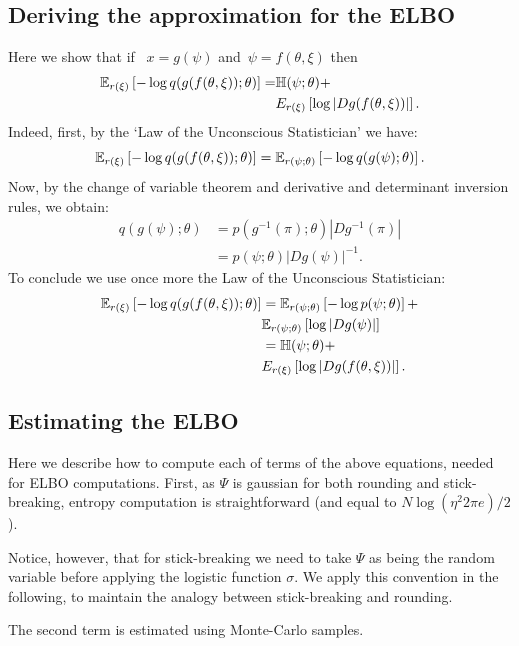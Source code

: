 \documentclass[twoside]{article}
\begin{document}
\subsection*{Deriving the approximation for the ELBO}
Here we show that if ~${x = g(\psi)}$ and~${\psi = f(\theta,
  \xi)}$ then \begin{align} \nonumber
\mathbb{E}_{r(\xi)} \left[- \log q(g(f(\theta, \xi)); \theta) \right] = & \mathbb{H}(\psi; \theta) +\\ \nonumber & E_{r(\xi)}\left[\log | Dg(f(\theta, \xi))|\right].\end{align}
Indeed, first, by the `Law of the Unconscious Statistician' we have:
 $$\mathbb{E}_{r(\xi)} \left[- \log q(g(f(\theta, \xi)); \theta) \right] = \mathbb{E}_{r(\psi;\theta)} \left[- \log q(g(\psi); \theta) \right]. $$
Now, by the change of variable theorem and derivative and determinant inversion rules, we obtain:\begin{align}
\nonumber q(g(\psi); \theta) & = p(g^{-1}(\pi) ;\theta)  |Dg ^{-1}(\pi) | \\ \nonumber
 & = p(\psi;\theta) | Dg (\psi) | ^{-1}.
 \end{align}
 To conclude we use once more the Law of the Unconscious Statistician:
 \begin{align}
\nonumber  \mathbb{E}_{r(\xi)} \left[- \log q(g(f(\theta, \xi)); \theta) \right]  &= \mathbb{E}_{r(\psi;\theta)}\left[ - \log p(\psi;\theta)\right] +   \\ & \nonumber \mathbb{E}_{r(\psi;\theta)}\left[\log | Dg(\psi)|\right] \\ \nonumber
 &= \mathbb{H}(\psi; \theta)+ \\ \nonumber & E_{r(\xi)}\left[\log | Dg(f(\theta, \xi))|\right].\end{align}
 

\subsection*{Estimating the ELBO} 
Here we describe how to compute each of terms of the above equations, needed for ELBO computations. First, as $\Psi$ is gaussian for both rounding and stick-breaking, entropy computation is straightforward (and equal to $N\log(\eta^2 2\pi e )/2$). 

Notice, however, that for stick-breaking we need to take $\Psi$ as being the random variable before applying the logistic function $\sigma$. We apply this convention in the following, to maintain the analogy between stick-breaking and rounding.

The second term is estimated using Monte-Carlo samples. 
\end{document}

